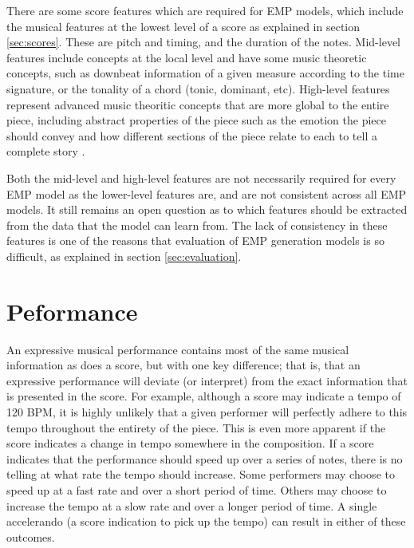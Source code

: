 There are some score features which are required for EMP models, which include the musical features at the lowest level of a score as explained in section \ref{sec:scores}. These are pitch and timing, and the duration of the notes. Mid-level features include concepts at the local level and have some music theoretic concepts, such as downbeat information of a given measure according to the time signature, or the tonality of a chord (tonic, dominant, etc). High-level features represent advanced music theoritic concepts that are more global to the entire piece, including abstract properties of the piece such as the emotion the piece should convey and how different sections of the piece relate to each to tell a complete story \cite{eduardo2018computational}. 

Both the mid-level and high-level features are not necessarily required for every EMP model as the lower-level features are, and are not consistent across all EMP models. It still remains an open question as to which features should be extracted from the data that the model can learn from. The lack of consistency in these features is one of the reasons that evaluation of EMP generation models is so difficult, as explained in section \ref{sec:evaluation}. 


\section{Peformance}\label{sec:performance}
An expressive musical performance contains most of the same musical information as does a score, but with one key difference; that is, that an expressive performance will deviate (or interpret) from the exact information that is presented in the score. For example, although a score may indicate a tempo of 120 BPM, it is highly unlikely that a given performer will perfectly adhere to this tempo throughout the entirety of the piece. This is even more apparent if the score indicates a change in tempo somewhere in the composition. If a score indicates that the performance should speed up over a series of notes, there is no telling at what rate the tempo should increase. Some performers may choose to speed up at a fast rate and over a short period of time. Others may choose to increase the tempo at a slow rate and over a longer period of time. A single accelerando (a score indication to pick up the tempo) can result in either of these outcomes. 

